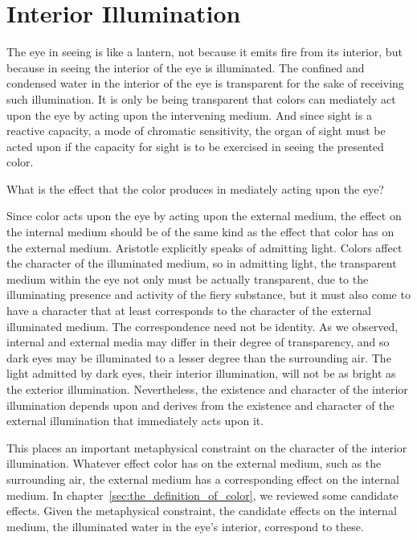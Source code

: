 
\section{Interior Illumination} %
\label{sec:interior_illumination}

The eye in seeing is like a lantern, not because it emits fire from its interior, but because in seeing the interior of the eye is illuminated. The confined and condensed water in the interior of the eye is transparent for the sake of receiving such illumination. It is only be being transparent that colors can mediately act upon the eye by acting upon the intervening medium. And since sight is a reactive capacity, a mode of chromatic sensitivity, the organ of sight must be acted upon if the capacity for sight is to be exercised in seeing the presented color.

What is the effect that the color produces in mediately acting upon the eye?

Since color acts upon the eye by acting upon the external me\-di\-um, the effect on the internal medium should be of the same kind as the effect that color has on the external medium. Aristotle explicitly speaks of admitting light. Colors affect the character of the illuminated medium, so in admitting light, the transparent medium within the eye not only must be actually transparent, due to the illuminating presence and activity of the fiery substance, but it must also come to have a character that at least corresponds to the character of the external illuminated medium. The correspondence need not be identity. As we observed, internal and external media may differ in their degree of transparency, and so dark eyes may be illuminated to a lesser degree than the surrounding air. The light admitted by dark eyes, their interior illumination, will not be as bright as the exterior illumination. Nevertheless, the existence and character of the interior illumination depends upon and derives from the existence and character of the external illumination that immediately acts upon it.

This places an important metaphysical constraint on the character of the interior illumination. Whatever effect color has on the external medium, such as the surrounding air, the external medium has a corresponding effect on the internal medium. In chapter~\ref{sec:the_definition_of_color}, we reviewed some candidate effects. Given the metaphysical constraint, the candidate effects on the internal medium, the illuminated water in the eye's interior, correspond to these.

